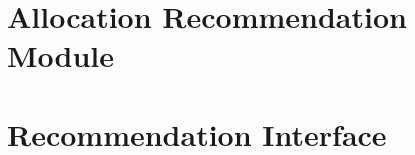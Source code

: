 \section{Allocation Recommendation Module}
\label{sec:allocation_module}


\section{Recommendation Interface}
\label{sec:interface}

